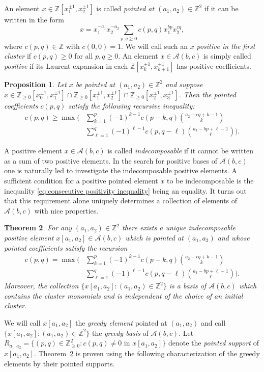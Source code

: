 \documentclass[11pt]{amsart}
\newtheorem{theorem}{Theorem}[section]
\newtheorem{prop}[theorem]{Proposition}
\theoremstyle{remark}
\numberwithin{equation}{section}
\newcommand{\ZZ}{\mathbb{Z}}
\newcommand{\cA}{\mathcal{A}}
\begin{document}
An element $x\in\ZZ[x_1^{\pm1},x_2^{\pm1}]$ is called \emph{pointed at
$(a_1,a_2)\in\ZZ^2$} if it can be written in the form
\[
  x=x_1^{-a_1}x_2^{-a_2}\sum\limits_{p,q\ge0}c(p,q)x_1^{bp}x_2^{cq},
\]
where $c(p,q)\in\ZZ$ with $c(0,0)=1$.  We will call such an $x$ \emph{positive
in the first cluster} if $c(p,q)\ge0$ for all $p,q\ge0$.  An element $x\in\cA(b,c)$ is simply called \emph{positive} if its Laurent expansion in each $\ZZ[x_k^{\pm1},x_{k+1}^{\pm1}]$ has positive coefficients.
\begin{prop}\cite[Proposition~1.5]{LLZ}
  Let $x$ be pointed at $(a_1,a_2)\in\ZZ^2$ and suppose
  $x\in\ZZ_{\ge0}[x_0^{\pm1},x_1^{\pm1}]
  \cap\ZZ_{\ge0}[x_1^{\pm1},x_2^{\pm1}]
  \cap\ZZ_{\ge0}[x_2^{\pm1},x_3^{\pm1}]$.
  Then the pointed coefficients $c(p,q)$ satisfy the following recursive
  inequality:
  \begin{align}
    \label{eq:consecutive positivity inequality}
    c(p,q)\ge\max\bigg(
    &\sum\limits_{k=1}^p (-1)^{k-1}c(p-k,q){a_2-cq+k-1\choose k}\\
    \nonumber&\sum\limits_{\ell=1}^q (-1)^{\ell-1}c(p,q-\ell){a_1-bp+\ell-1\choose \ell}\bigg).
  \end{align}
\end{prop}
A positive element $x\in\cA(b,c)$ is called \emph{indecomposable} if it cannot
be written as a sum of two positive elements.  In the search for positive bases
of $\cA(b,c)$ one is naturally led to investigate the indecomposable positive
elements.  A sufficient condition for a positive pointed element $x$ to be
indecomposable is the inequality \eqref{eq:consecutive positivity inequality}
being an equality.  It turns out that this requirement alone uniquely determines
a collection of elements of $\cA(b,c)$ with nice properties.

\begin{theorem}\label{th:greedy}\cite[Theorem~1.7]{LLZ}
  For any $(a_1,a_2)\in\ZZ^2$ there exists a unique indecomposable positive
  element $x[a_1,a_2]\in\cA(b,c)$ which is pointed at $(a_1,a_2)$ and whose
  pointed coefficients satisfy the recursion
  \begin{align}
    \label{eq:greey recursion}
    c(p,q)=\max\bigg(
    &\sum\limits_{k=1}^p (-1)^{k-1}c(p-k,q){a_2-cq+k-1\choose k}\\
    \nonumber&\sum\limits_{\ell=1}^q (-1)^{\ell-1}c(p,q-\ell){a_1-bp+\ell-1\choose \ell}\bigg).
  \end{align}
  Moreover, the collection $\{x[a_1,a_2]:(a_1,a_2)\in\ZZ^2\}$ is a basis of
  $\cA(b,c)$ which contains the cluster monomials and is independent of the
  choice of an initial cluster.
\end{theorem}
We will call $x[a_1,a_2]$ the \emph{greedy element} pointed at $(a_1,a_2)$ and
call $\{x[a_1,a_2]:(a_1,a_2)\in\ZZ^2\}$ the \emph{greedy basis} of $\cA(b,c)$.  Let
$R_{a_1,a_2}=\{(p,q)\in\ZZ_{\ge0}^2:c(p,q)\ne0 \text{ in } x[a_1,a_2]\}$ denote
the \emph{pointed support} of $x[a_1,a_2]$.  Theorem~\ref{th:greedy} is proven using the following characterization of the greedy elements by their
pointed supports.
\end{document}
